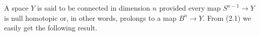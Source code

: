 A space $Y$ is said to be connected in dimension $n$ provided every map $S^{n-1} \rightarrow Y$ is null homotopic or, in other words, prolongs to a map $B^n \rightarrow Y$. From (2.1) we easily get the following result.
